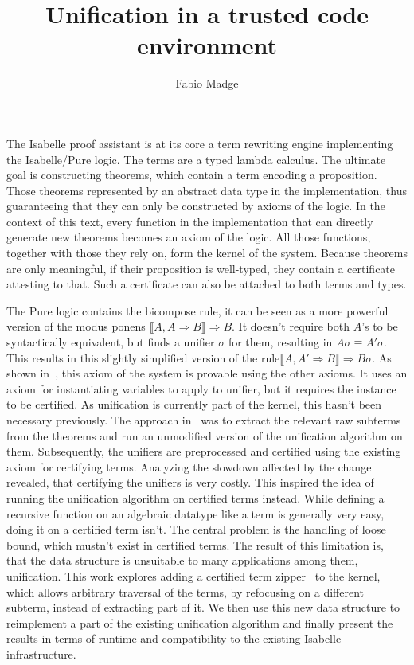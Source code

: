 \documentclass[12pt,a4paper]{article}
\title{Unification in a trusted code environment}
\author{Fabio Madge}
\date{}
\begin{document}
\maketitle
The Isabelle proof assistant is at its core a term rewriting engine implementing the Isabelle/Pure logic.
The terms are a typed lambda calculus. The ultimate goal is constructing theorems, which contain a term encoding a proposition.
Those theorems represented by an abstract data type in the implementation, thus guaranteeing that they can only be constructed by axioms of the logic.
In the context of this text, every function in the implementation that can directly generate new theorems becomes an axiom of the logic.
All those functions, together with those they rely on, form the kernel of the system.
Because theorems are only meaningful, if their proposition is well-typed, they contain a certificate attesting to that.
Such a certificate can also be attached to both terms and types.

The Pure logic contains the bicompose rule, it can be seen as a more powerful version of the modus ponens \(\llbracket A, A \Longrightarrow B \rrbracket \Longrightarrow B\).
It doesn't require both \(A\)'s to be syntactically equivalent, but finds a unifier \(\sigma\) for them, resulting in \(A\sigma \equiv A'\sigma\).
This results in this slightly simplified version of the rule\(\llbracket A, A' \Longrightarrow B \rrbracket \Longrightarrow B\sigma\).
As shown in~\cite{Madge2017}, this axiom of the system is provable using the other axioms.
It uses an axiom for instantiating variables to apply to unifier, but it requires the instance to be certified.
As unification is currently part of the kernel, this hasn't been necessary previously.
The approach in~\cite{Madge2017} was to extract the relevant raw subterms from the theorems and run an unmodified version of the unification algorithm on them.
Subsequently, the unifiers are preprocessed and certified using the existing axiom for certifying terms.
Analyzing the slowdown affected by the change revealed, that certifying the unifiers is very costly.
This inspired the idea of running the unification algorithm on certified terms instead.
While defining a recursive function on an algebraic datatype like a term is generally very easy, doing it on a certified term isn't.
The central problem is the handling of loose bound, which mustn't exist in certified terms.
The result of this limitation is, that the data structure is unsuitable to many applications among them, unification.
This work explores adding a certified term zipper~\cite{Huet1997} to the kernel, which allows arbitrary traversal of the terms, by refocusing on a different subterm, instead of extracting part of it.
We then use this new data structure to reimplement a part of the existing unification algorithm and finally present the results in terms of runtime and compatibility to the existing Isabelle infrastructure.
\end{document}
